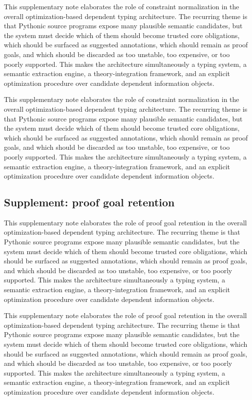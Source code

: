 \documentclass[11pt]{article}
\theoremstyle{definition}
\theoremstyle{plain}
\begin{document}
This supplementary note elaborates the role of constraint normalization in the overall
optimization-based dependent typing architecture. The recurring theme is that
Pythonic source programs expose many plausible semantic candidates, but the
system must decide which of them should become trusted core obligations, which
should be surfaced as suggested annotations, which should remain as proof
goals, and which should be discarded as too unstable, too expensive, or too
poorly supported. This makes the architecture simultaneously a typing system,
a semantic extraction engine, a theory-integration framework, and an explicit
optimization procedure over candidate dependent information objects.

This supplementary note elaborates the role of constraint normalization in the overall
optimization-based dependent typing architecture. The recurring theme is that
Pythonic source programs expose many plausible semantic candidates, but the
system must decide which of them should become trusted core obligations, which
should be surfaced as suggested annotations, which should remain as proof
goals, and which should be discarded as too unstable, too expensive, or too
poorly supported. This makes the architecture simultaneously a typing system,
a semantic extraction engine, a theory-integration framework, and an explicit
optimization procedure over candidate dependent information objects.

\subsection{Supplement: proof goal retention}
This supplementary note elaborates the role of proof goal retention in the overall
optimization-based dependent typing architecture. The recurring theme is that
Pythonic source programs expose many plausible semantic candidates, but the
system must decide which of them should become trusted core obligations, which
should be surfaced as suggested annotations, which should remain as proof
goals, and which should be discarded as too unstable, too expensive, or too
poorly supported. This makes the architecture simultaneously a typing system,
a semantic extraction engine, a theory-integration framework, and an explicit
optimization procedure over candidate dependent information objects.

This supplementary note elaborates the role of proof goal retention in the overall
optimization-based dependent typing architecture. The recurring theme is that
Pythonic source programs expose many plausible semantic candidates, but the
system must decide which of them should become trusted core obligations, which
should be surfaced as suggested annotations, which should remain as proof
goals, and which should be discarded as too unstable, too expensive, or too
poorly supported. This makes the architecture simultaneously a typing system,
a semantic extraction engine, a theory-integration framework, and an explicit
optimization procedure over candidate dependent information objects.
\end{document}
